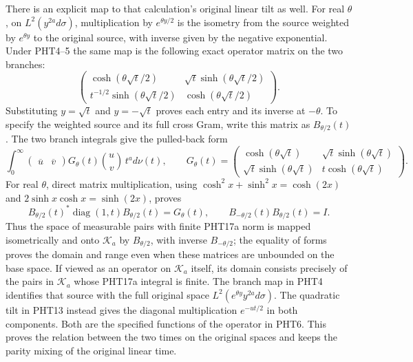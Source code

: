 \documentclass[11pt,a4paper]{article}
\begin{document}
There is an explicit map to that calculation's original
linear tilt as well. For real $\theta$, on $L^2(y^{2a}d\sigma)$, multiplication
by $e^{\theta y/2}$ is the isometry from the source weighted
by $e^{\theta y}$ to the original source, with inverse
given by the negative exponential. Under PHT4--5 the same
map is the following exact operator matrix on the two branches:
\[
 \begin{pmatrix}
  \cosh(\theta\sqrt t/2)&\sqrt t\sinh(\theta\sqrt t/2)\\
  t^{-1/2}\sinh(\theta\sqrt t/2)&\cosh(\theta\sqrt t/2)
 \end{pmatrix}.
\tag{PHT17}
\]
Substituting $y=\sqrt t$ and $y=-\sqrt t$ proves each entry
and its inverse at $-\theta$. To specify the weighted source
and its full cross Gram, write this matrix as $B_{\theta/2}(t)$.
The two branch integrals give the pulled-back form
\[
 \int_0^\infty
 \begin{pmatrix}\overline u&\overline v\end{pmatrix}
 G_\theta(t)\binom uv\,t^a d\nu(t),\qquad
 G_\theta(t)=
 \begin{pmatrix}
  \cosh(\theta\sqrt t)&\sqrt t\sinh(\theta\sqrt t)\\
  \sqrt t\sinh(\theta\sqrt t)&t\cosh(\theta\sqrt t)
 \end{pmatrix}.
\tag{PHT17a}
\]
For real $\theta$, direct matrix multiplication, using
$\cosh^2 x+\sinh^2 x=\cosh(2x)$ and
$2\sinh x\cosh x=\sinh(2x)$, proves
\[
 B_{\theta/2}(t)^*\operatorname{diag}(1,t)B_{\theta/2}(t)
       =G_\theta(t),\qquad
 B_{-\theta/2}(t)B_{\theta/2}(t)=I.
\]
Thus the space of measurable pairs with finite PHT17a norm
is mapped isometrically and onto $\mathcal K_a$ by
$B_{\theta/2}$, with inverse $B_{-\theta/2}$; the equality of
forms proves the domain and range even when these matrices
are unbounded on the base space. If viewed as an operator
on $\mathcal K_a$ itself, its domain consists precisely of
the pairs in $\mathcal K_a$ whose PHT17a integral is finite.
The branch map in PHT4 identifies that source with the full
original space $L^2(e^{\theta y}y^{2a}d\sigma)$.
The quadratic tilt in PHT13
instead gives the diagonal multiplication $e^{-ut/2}$ in
both components. Both are the specified functions of the
operator in PHT6. This proves the relation between the two
times on the original spaces and keeps the parity mixing of
the original linear time.
\end{document}
